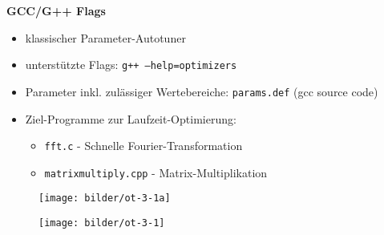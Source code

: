     \begingroup
    \begin{frame}
      
    \textbf{GCC/G++ Flags}
      \begin{itemize}
        \item klassischer Parameter-Autotuner
        \item unterstützte Flags: \texttt{g++ --help=optimizers}
        \item Parameter inkl. zulässiger Wertebereiche: \texttt{params.def} (gcc source code)
        
        
        \item Ziel-Programme zur Laufzeit-Optimierung:
        \begin{itemize}
          \item \texttt{fft.c} - Schnelle Fourier-Transformation
          \item \texttt{matrixmultiply.cpp} - Matrix-Multiplikation
        \end{itemize}        
      \end{itemize}
    \end{frame}
    \endgroup
        
    \begingroup
  \begin{frame}
    \begin{figure}[ht]
      \centering	      
      \texttt{[image: bilder/ot-3-1a]}
      \label{gccpy1a}
    \end{figure}
  \end{frame}
  \endgroup
  
  \begingroup
  \begin{frame}
    \begin{figure}[ht]
      \centering	      
      \texttt{[image: bilder/ot-3-1]}
      \label{gccpy1}
    \end{figure}
  \end{frame}
\endgroup
  
